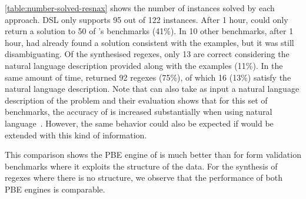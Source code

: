 \autoref{table:number-solved-resnax} shows the number of instances solved by each approach. \Forest{} DSL only supports 95 out of 122 instances. After 1 hour, \Forest{} could only return a solution to 50 of \Regel{}'s benchmarks (41\%). In 10 other benchmarks, after 1 hour, \Forest{} had already found a solution consistent with the examples, but it was still disambiguating. Of the synthesised regexes, only 13 are correct considering the natural language description provided along with the examples (11\%). In the same amount of time, \Regel{} returned 92 regexes (75\%), of which 16 (13\%) satisfy the natural language description. Note that \Regel{} can also take as input a natural language description of the problem and their evaluation shows that for this set of benchmarks, the accuracy of \Regel{} is increased substantially when using natural language~\cite{Regel20}. However, the same behavior could also be expected if \Forest{} would be extended with this kind of information.

This comparison shows the PBE engine of \Forest{} is much better than \Regel{} for form validation benchmarks where it exploits the structure of the data. For the synthesis of regexes where there is no structure, we observe that the performance of both PBE engines is comparable.

